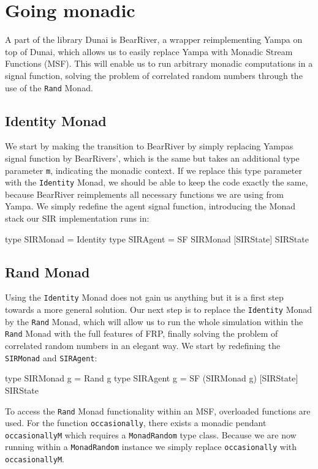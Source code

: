 \section{Going monadic}
\label{sec:timedriven_monadic}
A part of the library Dunai is BearRiver, a wrapper reimplementing Yampa on top of Dunai, which allows us to easily replace Yampa with Monadic Stream Functions (MSF). This will enable us to run arbitrary monadic computations in a signal function, solving the problem of correlated random numbers through the use of the \texttt{Rand} Monad.

\subsection{Identity Monad}
We start by making the transition to BearRiver by simply replacing Yampas signal function by BearRivers', which is the same but takes an additional type parameter \texttt{m}, indicating the monadic context. If we replace this type parameter with the \texttt{Identity} Monad, we should be able to keep the code exactly the same, because BearRiver reimplements all necessary functions we are using from Yampa. We simply redefine the agent signal function, introducing the Monad stack our SIR implementation runs in:

\begin{HaskellCode}
type SIRMonad = Identity
type SIRAgent = SF SIRMonad [SIRState] SIRState
\end{HaskellCode}

\subsection{Rand Monad}
Using the \texttt{Identity} Monad does not gain us anything but it is a first step towards a more general solution. Our next step is to replace the \texttt{Identity} Monad by the \texttt{Rand} Monad, which will allow us to run the whole simulation within the \texttt{Rand} Monad with the full features of FRP, finally solving the problem of correlated random numbers in an elegant way. We start by redefining the \texttt{SIRMonad} and \texttt{SIRAgent}:

\begin{HaskellCode}
type SIRMonad g = Rand g
type SIRAgent g = SF (SIRMonad g) [SIRState] SIRState
\end{HaskellCode}

To access the \texttt{Rand} Monad functionality within an MSF, overloaded functions are used. For the function \texttt{occasionally}, there exists a monadic pendant \texttt{occasionallyM} which requires a \texttt{MonadRandom} type class. Because we are now running within a \texttt{MonadRandom} instance we simply replace \texttt{occasionally} with \texttt{occasionallyM}. 

